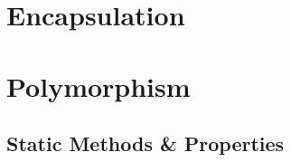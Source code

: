 \documentclass[b5paper,openany]{book}
\begin{document}
\chapter{Encapsulation}


\chapter{Polymorphism}


\begin{readonly}
    \chapter{Static Methods \& Properties}
    
\end{readonly}






\end{document}
